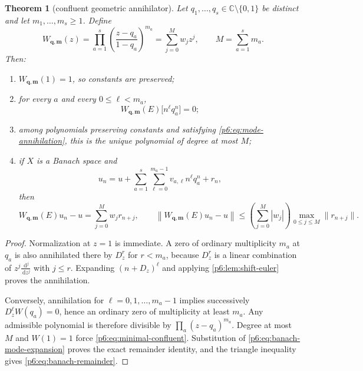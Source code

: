 \documentclass[11pt]{article}
\numberwithin{equation}{section}
\newtheorem{theorem}{Theorem}[section]
\theoremstyle{definition}
\theoremstyle{remark}
\newcommand{\C}{\mathbb C}
\newcommand{\dd}{\,\mathrm d}
\begin{document}
\begin{theorem}[confluent geometric annihilator]
\label{p6:thm:confluent-annihilator}
Let $q_1,\ldots,q_s\in\C\setminus\{0,1\}$ be distinct and let
$m_1,\ldots,m_s\ge1$.  Define
\begin{equation}
 W_{\bm q,\bm m}(z)
 =\prod_{a=1}^{s}\left(\frac{z-q_a}{1-q_a}\right)^{m_a}
 =\sum_{j=0}^{M}w_jz^j,
 \qquad M=\sum_{a=1}^{s}m_a.
 \label{p6:eq:minimal-confluent}
\end{equation}
Then:
\begin{enumerate}
\item $W_{\bm q,\bm m}(1)=1$, so constants are preserved;
\item for every $a$ and every $0\le\ell<m_a$,
\begin{equation}
 W_{\bm q,\bm m}(E)\bigl[n^\ell q_a^n\bigr]=0;
 \label{p6:eq:mode-annihilation}
\end{equation}
\item among polynomials preserving constants and satisfying
\eqref{p6:eq:mode-annihilation}, this is the unique polynomial of degree at most $M$;
\item if $X$ is a Banach space and
\begin{equation}
 u_n=u+\sum_{a=1}^{s}\sum_{\ell=0}^{m_a-1}v_{a,\ell}n^\ell q_a^n+r_n,
 \label{p6:eq:banach-mode-expansion}
\end{equation}
then
\begin{equation}
 W_{\bm q,\bm m}(E)u_n-u
 =\sum_{j=0}^{M}w_jr_{n+j},
 \qquad
 \left\|W_{\bm q,\bm m}(E)u_n-u\right\|
 \le\left(\sum_{j=0}^{M}|w_j|\right)
 \max_{0\le j\le M}\|r_{n+j}\|.
 \label{p6:eq:banach-remainder}
\end{equation}
\end{enumerate}
\end{theorem}

\begin{proof}
Normalization at $z=1$ is immediate.  A zero of ordinary multiplicity $m_a$ at $q_a$
is also annihilated there by $D_z^r$ for $r<m_a$, because $D_z^r$ is a linear
combination of $z^j\frac{\dd^j}{\dd z^j}$ with $j\le r$.  Expanding
$(n+D_z)^\ell$ and applying \cref{p6:lem:shift-euler} proves the annihilation.

Conversely, annihilation for $\ell=0,1,\ldots,m_a-1$ implies successively
$D_z^\ell W(q_a)=0$, hence an ordinary zero of multiplicity at least $m_a$.  Any
admissible polynomial is therefore divisible by $\prod_a(z-q_a)^{m_a}$.  Degree at most
$M$ and $W(1)=1$ force \eqref{p6:eq:minimal-confluent}.  Substitution of
\eqref{p6:eq:banach-mode-expansion} proves the exact remainder identity, and the triangle
inequality gives \eqref{p6:eq:banach-remainder}.
\end{proof}
\end{document}
